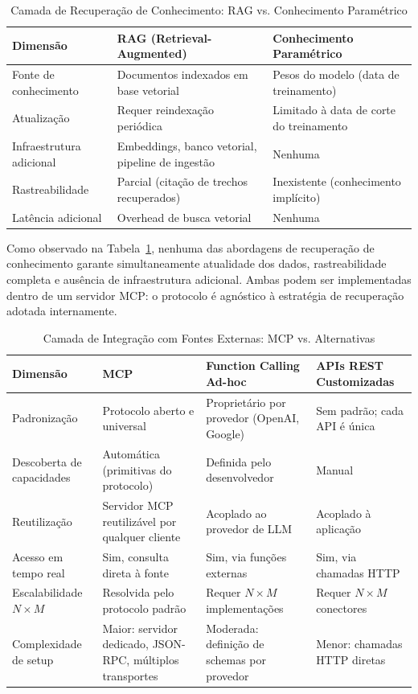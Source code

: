 \documentclass[12pt]{article}
\begin{document}
\begin{table}[htbp]
\centering
\caption{Camada de Recuperação de Conhecimento: RAG vs. Conhecimento Paramétrico}
\label{tab:camada-recuperacao}
\begin{tabularx}{\textwidth}{| l | >{\raggedright\arraybackslash}X | >{\raggedright\arraybackslash}X |}
\hline
\textbf{Dimensão} & \textbf{RAG (Retrieval-Augmented)} & \textbf{Conhecimento Paramétrico} \\
\hline
Fonte de conhecimento & Documentos indexados em base vetorial & Pesos do modelo (data de treinamento) \\
\hline
Atualização & Requer reindexação periódica & Limitado à data de corte do treinamento \\
\hline
Infraestrutura adicional & Embeddings, banco vetorial, pipeline de ingestão & Nenhuma \\
\hline
Rastreabilidade & Parcial (citação de trechos recuperados) & Inexistente (conhecimento implícito) \\
\hline
Latência adicional & Overhead de busca vetorial & Nenhuma \\
\hline
\end{tabularx}
\end{table}

Como observado na Tabela~\ref{tab:camada-recuperacao}, nenhuma das abordagens de recuperação de conhecimento garante simultaneamente atualidade dos dados, rastreabilidade completa e ausência de infraestrutura adicional. Ambas podem ser implementadas dentro de um servidor MCP: o protocolo é agnóstico à estratégia de recuperação adotada internamente.

\begin{table}[htbp]
\centering
\caption{Camada de Integração com Fontes Externas: MCP vs. Alternativas}
\label{tab:camada-integracao}
\begin{tabularx}{\textwidth}{| l | >{\raggedright\arraybackslash}X | >{\raggedright\arraybackslash}X | >{\raggedright\arraybackslash}X |}
\hline
\textbf{Dimensão} & \textbf{MCP} & \textbf{Function Calling Ad-hoc} & \textbf{APIs REST Customizadas} \\
\hline
Padronização & Protocolo aberto e universal & Proprietário por provedor (OpenAI, Google) & Sem padrão; cada API é única \\
\hline
Descoberta de capacidades & Automática (primitivas do protocolo) & Definida pelo desenvolvedor & Manual \\
\hline
Reutilização & Servidor MCP reutilizável por qualquer cliente & Acoplado ao provedor de LLM & Acoplado à aplicação \\
\hline
Acesso em tempo real & Sim, consulta direta à fonte & Sim, via funções externas & Sim, via chamadas HTTP \\
\hline
Escalabilidade $N \times M$ & Resolvida pelo protocolo padrão & Requer $N \times M$ implementações & Requer $N \times M$ conectores \\
\hline
Complexidade de setup & Maior: servidor dedicado, JSON-RPC, múltiplos transportes & Moderada: definição de schemas por provedor & Menor: chamadas HTTP diretas \\
\hline
\end{tabularx}
\end{table}
\end{document}
